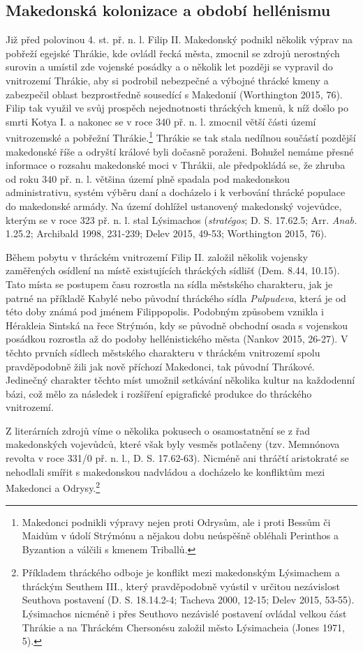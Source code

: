 \subsection[makedonská-kolonizace-a-období-hellénismu]{Makedonská kolonizace a období hellénismu}

Již před polovinou 4. st. př. n. l. Filip II. Makedonský podnikl několik výprav na pobřeží egejské Thrákie, kde ovládl řecká města, zmocnil se zdrojů nerostných surovin a umístil zde vojenské posádky a o několik let později se vypravil do vnitrozemí Thrákie, aby si podrobil nebezpečné a výbojné thrácké kmeny a zabezpečil oblast bezprostředně sousedící s Makedonií (Worthington 2015, 76). Filip tak využil ve svůj prospěch nejednotnosti thráckých kmenů, k níž došlo po smrti Kotya I. a nakonec se v roce 340 př. n. l. zmocnil větší části území vnitrozemské a pobřežní Thrákie.\footnote{Makedonci podnikli výpravy nejen proti Odrysům, ale i proti Bessům či Maidům v údolí Strýmónu a nějakou dobu neúspěšně obléhali Perinthos a Byzantion a válčili s kmenem Triballů.} Thrákie se tak stala nedílnou součástí pozdější makedonské říše a odryští králové byli dočasně poraženi. Bohužel nemáme přesné informace o rozsahu makedonské moci v Thrákii, ale předpokládá se, že zhruba od roku 340 př. n. l. většina území plně spadala pod makedonskou administrativu, systém výběru daní a docházelo i k verbování thrácké populace do makedonské armády. Na území dohlížel ustanovený makedonský vojevůdce, kterým se v roce 323 př. n. l. stal Lýsimachos ({\em stratégos}; D. S. 17.62.5; Arr. {\em Anab.} 1.25.2; Archibald 1998, 231-239; Delev 2015, 49-53; Worthington 2015, 76).

Během pobytu v thráckém vnitrozemí Filip II. založil několik vojensky zaměřených osídlení na místě existujících thráckých sídlišť (Dem. 8.44, 10.15). Tato místa se postupem času rozrostla na sídla městského charakteru, jak je patrné na příkladě Kabylé nebo původní thráckého sídla {\em Pulpudeva}, která je od této doby známá pod jménem Filippopolis. Podobným způsobem vznikla i Hérakleia Sintská na řece Strýmón, kdy se původně obchodní osada s vojenskou posádkou rozrostla až do podoby hellénistického města (Nankov 2015, 26-27). V těchto prvních sídlech městského charakteru v thráckém vnitrozemí spolu pravděpodobně žili jak nově příchozí Makedonci, tak původní Thrákové. Jedinečný charakter těchto míst umožnil setkávání několika kultur na každodenní bázi, což mělo za následek i rozšíření epigrafické produkce do thráckého vnitrozemí.

Z literárních zdrojů víme o několika pokusech o osamostatnění se z řad makedonských vojevůdců, které však byly vesměs potlačeny (tzv. Memnónova revolta v roce 331/0 př. n. l., D. S. 17.62-63). Nicméně ani thráčtí aristokraté se nehodlali smířit s makedonskou nadvládou a docházelo ke konfliktům mezi Makedonci a Odrysy.\footnote{Příkladem thráckého odboje je konflikt mezi makedonským Lýsimachem a thráckým Seuthem III., který pravděpodobně vyústil v určitou nezávislost Seuthova postavení (D. S. 18.14.2-4; Tacheva 2000, 12-15; Delev 2015, 53-55). Lýsimachos nicméně i přes Seuthovo nezávislé postavení ovládal velkou část Thrákie a na Thráckém Chersonésu založil město Lýsimacheia (Jones 1971, 5).}

